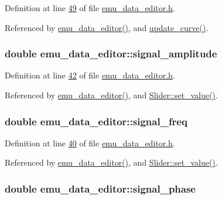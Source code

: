 Definition at line \hyperlink{a00036_source_l00049}{49} of file \hyperlink{a00036_source}{emu\+\_\+data\+\_\+editor.\+h}.



Referenced by \hyperlink{a00035_source_l00012}{emu\+\_\+data\+\_\+editor()}, and \hyperlink{a00035_source_l00284}{update\+\_\+curve()}.

\hypertarget{a00004_a73dabe63bd74afe2776e8136211dc36e}{
\subsubsection[{signal\+\_\+amplitude}]{\setlength{\rightskip}{0pt plus 5cm}double emu\+\_\+data\+\_\+editor\+::signal\+\_\+amplitude}}\label{a00004_a73dabe63bd74afe2776e8136211dc36e}


Definition at line \hyperlink{a00036_source_l00042}{42} of file \hyperlink{a00036_source}{emu\+\_\+data\+\_\+editor.\+h}.



Referenced by \hyperlink{a00035_source_l00012}{emu\+\_\+data\+\_\+editor()}, and \hyperlink{a00046_source_l00102}{Slider\+::set\+\_\+value()}.

\hypertarget{a00004_a67039999d520fc483fab521fae5ddde4}{
\subsubsection[{signal\+\_\+freq}]{\setlength{\rightskip}{0pt plus 5cm}double emu\+\_\+data\+\_\+editor\+::signal\+\_\+freq}}\label{a00004_a67039999d520fc483fab521fae5ddde4}


Definition at line \hyperlink{a00036_source_l00040}{40} of file \hyperlink{a00036_source}{emu\+\_\+data\+\_\+editor.\+h}.



Referenced by \hyperlink{a00035_source_l00012}{emu\+\_\+data\+\_\+editor()}, and \hyperlink{a00046_source_l00102}{Slider\+::set\+\_\+value()}.

\hypertarget{a00004_af08de88fdfe283086e3cca97a2965678}{
\subsubsection[{signal\+\_\+phase}]{\setlength{\rightskip}{0pt plus 5cm}double emu\+\_\+data\+\_\+editor\+::signal\+\_\+phase}}\label{a00004_af08de88fdfe283086e3cca97a2965678}


